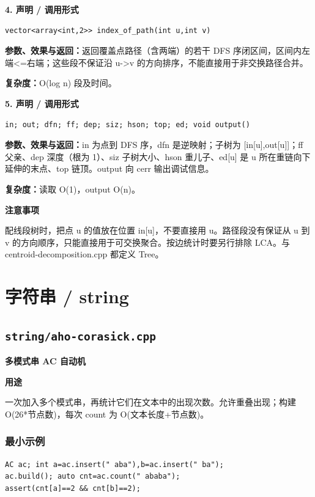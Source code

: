\documentclass[UTF8,a4paper,10pt]{ctexart}
\newcommand{\TemplUsage}[1]{\textbf{用途}\par #1\par}
\newcommand{\TemplNote}[1]{\textbf{注意事项}\par #1\par}
\begin{document}
\noindent\begin{minipage}{\textwidth}
\textbf{4. 声明 / 调用形式}
\begin{lstlisting}
vector<array<int,2>> index_of_path(int u,int v)
\end{lstlisting}
\textbf{参数、效果与返回：}返回覆盖点路径（含两端）的若干 DFS 序闭区间，区间内左端<=右端；这些段不保证沿 u->v 的方向排序，不能直接用于非交换路径合并。

\textbf{复杂度：}O(log n) 段及时间。

\end{minipage}\par\vspace{0.4em}
\noindent\begin{minipage}{\textwidth}
\textbf{5. 声明 / 调用形式}
\begin{lstlisting}
in; out; dfn; ff; dep; siz; hson; top; ed; void output()
\end{lstlisting}
\textbf{参数、效果与返回：}in 为点到 DFS 序，dfn 是逆映射；子树为 [in[u],out[u]]；ff 父亲、dep 深度（根为 1）、siz 子树大小、hson 重儿子、ed[u] 是 u 所在重链向下延伸的末点、top 链顶。output 向 cerr 输出调试信息。

\textbf{复杂度：}读取 O(1)，output O(n)。

\TemplNote{配线段树时，把点 u 的值放在位置 in[u]，不要直接用 u。路径段没有保证从 u 到 v 的方向顺序，只能直接用于可交换聚合。按边统计时要另行排除 LCA。与 centroid-decomposition.cpp 都定义 Tree。}
\end{minipage}\par\vspace{0.4em}
\clearpage
\section{字符串 / string}
\subsection{\texttt{string/aho-corasick.cpp}}
\textbf{多模式串 AC 自动机}\par
\TemplUsage{一次加入多个模式串，再统计它们在文本中的出现次数。允许重叠出现；构建 O(26*节点数)，每次 count 为 O(文本长度+节点数)。}
\subsubsection*{最小示例}
\begin{lstlisting}
AC ac; int a=ac.insert(" aba"),b=ac.insert(" ba");
ac.build(); auto cnt=ac.count(" ababa");
assert(cnt[a]==2 && cnt[b]==2);
\end{lstlisting}
\end{document}
